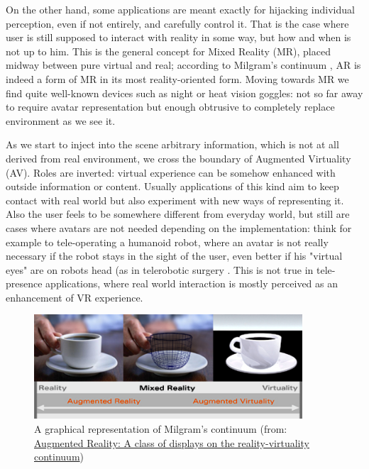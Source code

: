 On the other hand, some applications are meant exactly for hijacking individual perception, even if not entirely, and carefully control it. That is the case where user is still supposed to interact with reality in some way, but how and when is not up to him. This is the general concept for Mixed Reality (MR), placed midway between pure virtual and real; according to Milgram’s continuum \cite{milgram_continuum}, AR is indeed a form of MR in its most reality-oriented form. Moving towards MR we find quite well-known devices such as night or heat vision goggles: not so far away to require avatar representation but enough obtrusive to completely replace environment as we see it.

As we start to inject into the scene arbitrary information, which is not at all derived from real environment, we cross the boundary of Augmented Virtuality (AV). Roles are inverted: virtual experience can be somehow enhanced with outside information or content. Usually applications of this kind aim to keep contact with real world but also experiment with new ways of representing it. Also the user feels to be somewhere different from everyday world, but still are cases where avatars are not needed depending on the implementation: think for example to tele-operating a humanoid robot, where an avatar is not really necessary if the robot stays in the sight of the user, even better if his "virtual eyes" are on robots head (as in telerobotic surgery \cite{telepresence_intro}. This is not true in tele-presence applications, where real world interaction is mostly perceived as an enhancement of VR experience.

\begin{figure}
\centering
\includegraphics[width=10cm]{schemas/milgram_continuum_enhanced}
\caption{A graphical representation of Milgram's continuum (from: \href{http://proceedings.spiedigitallibrary.org/proceeding.aspx?articleid=981543}{Augmented Reality: A class of displays on the reality-virtuality continuum})}
\label{fig:milgram_continuum}
\end{figure}

